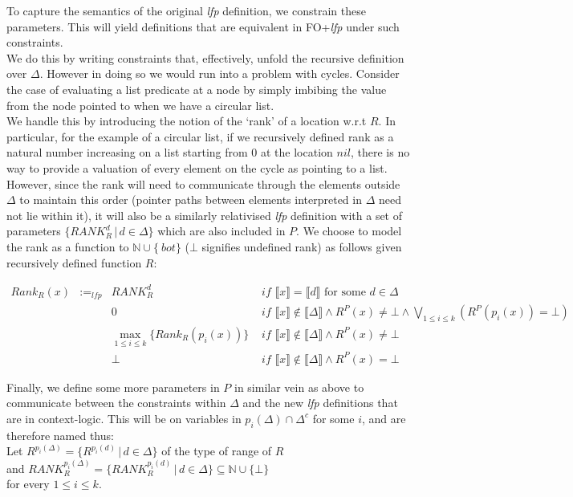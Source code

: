 To capture the semantics of the original \textit{lfp} definition, we constrain these parameters. This will yield definitions that are equivalent in FO+\textit{lfp} under such constraints.\\
We do this by writing constraints that, effectively, unfold the recursive definition over $\Delta{}$. However in doing so we would run into a problem with cycles. Consider the case of evaluating a list predicate at a node by simply imbibing the value from the node pointed to when we have a circular list.\\
We handle this by introducing the notion of the `rank' of a location w.r.t $R$. In particular, for the example of a circular list, if we recursively defined rank as a natural number increasing on a list starting from $0$ at the location $nil$, there is no way to provide a valuation of every element on the cycle as pointing to a list. However, since the rank will need to communicate through the elements outside $\Delta{}$ to maintain this order (pointer paths between elements interpreted in $\Delta{}$ need not lie within it), it will also be a similarly relativised \textit{lfp} definition with a set of parameters $\{\textit{RANK}_{R}^{d} \,|\, d \in{} \Delta{} \}$ which are also included in $P$. We choose to model the rank as a function to $\mathbb{N} \cup{} \{\ bot{}\}$ ($\bot{}$ signifies undefined rank) as follows given recursively defined function $R$:

\begin{align*}
Rank_{R}(x) & :=_\textit{lfp} & \textit{RANK}_{R}^{d} & \textit{ if } \llbracket{}x\rrbracket{} = \llbracket{}d\rrbracket{} \textrm{ for some } d \in{}\Delta{} \tag{delta case}\\
& & 0 & \textit{ if } \llbracket{}x\rrbracket{} \notin{} \llbracket{}\Delta{}\rrbracket{} \land{} R^{P}(x) \neq{} \bot{} \land{}\bigvee\limits_{1 \leq{} i \leq{} k}\left( R^{P}(p_i(x)) = \bot{}\right) \tag{base case}\\
& & \max\limits_{1 \leq{} i \leq{} k}\{Rank_{R}(p_i(x))\} & \textit{ if } \llbracket{}x\rrbracket{} \notin{} \llbracket{}\Delta{}\rrbracket{} \land{} R^{P}(x) \neq{} \bot{} \tag{recursive case}\\
& & \bot{} & \textit{ if } \llbracket{}x\rrbracket{} \notin{} \llbracket{}\Delta{}\rrbracket{} \land{} R^{P}(x) = \bot{}\tag{undefined}
\end{align*}

Finally, we define some more parameters in $P$ in similar vein as above to communicate between the constraints within $\Delta{}$ and the new \textit{lfp} definitions that are in context-logic. This will be on variables in $p_i(\Delta{}) \cap{} \Delta^{c}$ for some $i$, and are therefore named thus:\\
Let $R^{p_i(\Delta)} = \{ R^{p_i(d)} \,|\, d \in{} \Delta{} \}$ of the type of range of $R$\\
and $\textit{RANK}_{R}^{p_i(\Delta)} = \{ \textit{RANK}_{R}^{p_i(d)} \,|\, d \in{} \Delta{} \} \subseteq{} \mathbb{N} \cup{} \{\bot{}\}$\\
for every $1\leq{} i \leq{}k$.\\\


